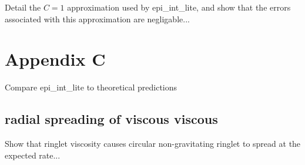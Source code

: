 \documentclass[preprint]{aastex62}
\begin{document}
Detail the $C=1$ approximation used by epi\_int\_lite, and show that the errors
associated with this approximation are negligable...

\section{Appendix C}
\label{sec:Appendix C}

Compare epi\_int\_lite to theoretical predictions

\subsection{radial spreading of viscous viscous}
\label{subsec:spreading}

Show that ringlet viscosity causes circular non-gravitating ringlet to
spread at the expected rate...

%

\end{document}
